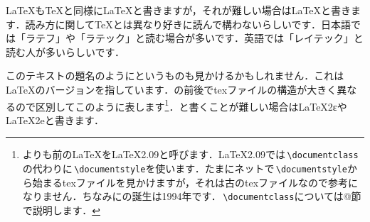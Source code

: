 \LaTeX も\TeX と同様に\LaTeX と書きますが，それが難しい場合はLaTeXと書きます．読み方に関して\TeX とは異なり好きに読んで構わないらしいです．日本語では「ラテフ」や「ラテック」と読む場合が多いです．英語では「レイテック」と読む人が多いらしいです．

このテキストの題名のように\LaTeXe というものも見かけるかもしれません．これは\LaTeX のバージョンを指しています．\LaTeXe の前後でtexファイルの構造が大きく異なるので区別してこのように表します\footnote{\LaTeXe よりも前の\LaTeX を\LaTeX 2.09と呼びます．\LaTeX 2.09では\,\texttt{\backslash documentclass}の代わりに\,\texttt{\backslash documentstyle}を使います．たまにネットで\,\texttt{\backslash documentstyle}から始まるtexファイルを見かけますが，それは古のtexファイルなので参考になりません．ちなみに\LaTeXe の誕生は1994年です．\,\texttt{\backslash documentclass}については@節で説明します．}．\LaTeXe と書くことが難しい場合はLaTeX2εやLaTeX2eと書きます．

